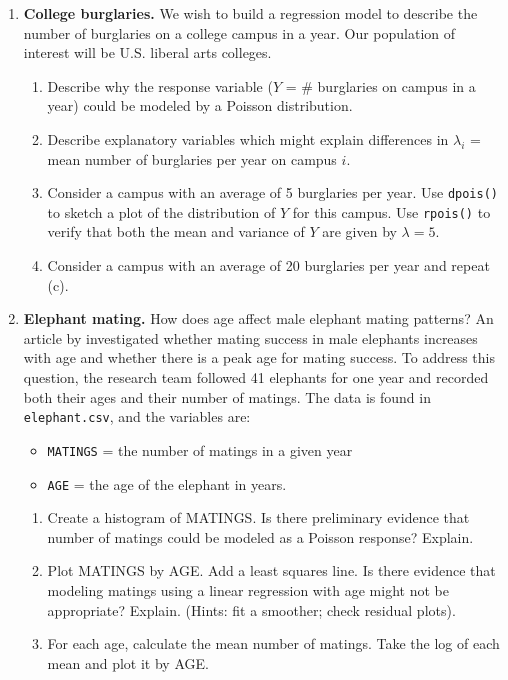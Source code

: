 \documentclass[
]{krantz}
\providecommand{\tightlist}{%
  \setlength{\itemsep}{0pt}\setlength{\parskip}{0pt}}
\begin{document}
\begin{enumerate}
\def\labelenumi{\arabic{enumi}.}
\tightlist
\item
  \textbf{College burglaries.} We wish to build a regression model to describe the number of burglaries on a college campus in a year. Our population of interest will be U.S. liberal arts colleges.

  \begin{enumerate}
  \def\labelenumii{\alph{enumii}.}
  \tightlist
  \item
    Describe why the response variable (\(Y\) = \# burglaries on campus in a year) could be modeled by a Poisson distribution.
  \item
    Describe explanatory variables which might explain differences in \(\lambda_i\) = mean number of burglaries per year on campus \(i\).
  \item
    Consider a campus with an average of 5 burglaries per year. Use \texttt{dpois()} to sketch a plot of the distribution of \(Y\) for this campus. Use \texttt{rpois()} to verify that both the mean and variance of \(Y\) are given by \(\lambda=5\).
  \item
    Consider a campus with an average of 20 burglaries per year and repeat (c).
  \end{enumerate}
\item
  \textbf{Elephant mating.} How does age affect male elephant mating patterns? An article by \citet{Poole1989} investigated whether mating success in male elephants increases with age and whether there is a peak age for mating success. To address this question, the research team followed 41 elephants for one year and recorded both their ages and their number of matings. The data \citep{Ramsey2002} is found in \texttt{elephant.csv}, and the variables are:

  \begin{itemize}
  \tightlist
  \item
    \texttt{MATINGS} = the number of matings in a given year
  \item
    \texttt{AGE} = the age of the elephant in years.
  \end{itemize}

  \begin{enumerate}
  \def\labelenumii{\alph{enumii}.}
  \tightlist
  \item
    Create a histogram of MATINGS. Is there preliminary evidence that number of matings could be modeled as a Poisson response? Explain.
  \item
    Plot MATINGS by AGE. Add a least squares line. Is there evidence that modeling matings using a linear regression with age might not be appropriate? Explain. (Hints: fit a smoother; check residual plots).
  \item
    For each age, calculate the mean number of matings. Take the log of each mean and plot it by AGE.


\end{enumerate}
\end{enumerate}
\end{document}
